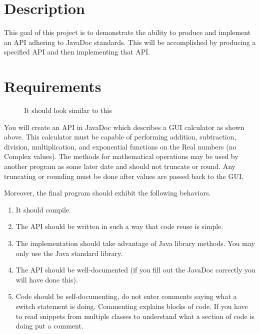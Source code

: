 \documentclass[]{simple}
\begin{document}
\section{Description}
This goal of this project is to demonstrate the ability to produce and implement an API adhering to JavaDoc standards.
This will be accomplished by producing a specified API and then implementing that API.
\section{Requirements}
\begin{figure}[h!]
\centering
\caption{It should look similar to this}
\end{figure}
You will create an API in JavaDoc which describes a GUI calculator as shown above.
This calculator must be capable of performing addition, subtraction, division, multiplication, and exponential functions on the Real numbers (no Complex values).
The methods for mathematical operations may be used by another program as some later date and should not truncate or round.
Any truncating or rounding must be done after values are passed back to the GUI.

Moreover, the final program should exhibit the following behaviors.
\begin{enumerate}
	\item It should compile.
	\item The API should be written in such a way that code reuse is simple.
	\item The implementation should take advantage of Java library methods. You may only use the Java standard library.
	\item The API should be well-documented (if you fill out the JavaDoc correctly you will have done this).
	\item Code should be self-documenting, do not enter comments saying what a switch statement is doing.
	Commenting explains blocks of code.
	If you have to read snippets from multiple classes to understand what a section of code is doing put a comment.
\end{enumerate}
\end{document}

